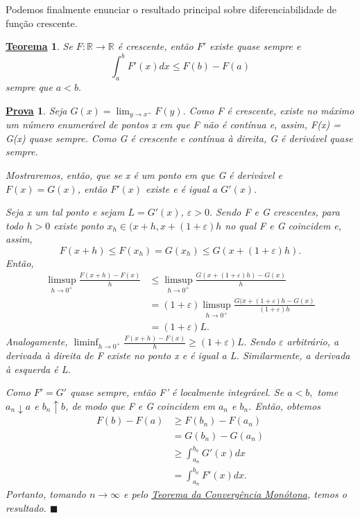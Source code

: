 \documentclass{article}
\newtheorem*{theorem*}{\underline{Teorema}}
\newtheorem*{proof*}{\underline{Prova}}
\renewcommand\qedsymbol{$\blacksquare$}
\begin{document}
  Podemos finalmente enunciar o resultado principal sobre diferenciabilidade de função crescente. 
 \begin{theorem*}
   Se \(F:\mathbb{R}\rightarrow \mathbb{R}\) é crescente, então \(F'\) existe quase sempre e 
     \[
       \int_{a}^{b}F'(x)dx \leq F(b) - F(a)
     \]
  sempre que \(a < b.\)
 \end{theorem*}
\begin{proof*}
  Seja \(G(x) = \lim_{y\to x^{+}}F(y).\) Como F é crescente, existe no máximo um número enumerável de pontos x em que F não é contínua e, assim, F(x) = G(x) quase sempre.
Como G é crescente e contínua à direita, G é derivável quase sempre. 

Mostraremos, então, que se x é um ponto em que G é derivável e \(F(x) = G(x)\), então \(F'(x)\) existe e é igual a \(G'(x).\)

Seja x um tal ponto e sejam \(L = G'(x)\), \(\varepsilon > 0.\) Sendo F e G crescentes, para todo \(h > 0\) existe ponto \(x_{h}\in (x+h, x + (1+\varepsilon )h\) no qual F e G coincidem e, assim, 
  \[
    F(x+h) \leq F(x_{h}) = G(x_{h}) \leq G(x+(1+\varepsilon )h).
  \]
Então, 
\begin{align*}
  \limsup_{h\to 0^{+}}\frac{F(x+h) - F(x)}{h} &\leq \limsup_{h\to 0^{+}}\frac{G(x+(1+\varepsilon )h)-G(x)}{h}\\ 
                                              &= (1+\varepsilon )\limsup_{h\to 0^{+}}\frac{G(x+(1+\varepsilon )h - G(x)}{(1+\varepsilon )h}\\ 
                                              &= (1+\varepsilon )L.
\end{align*}
Analogamente, \(\liminf_{h\to 0^{+}}\frac{F(x+h)-F(x)}{h}\geq (1+\varepsilon )L.\) Sendo \(\varepsilon \) arbitrário, a derivada à direita de F existe no ponto x e é igual a L. Similarmente, a derivada à esquerda é L. 

Como \(F'=G'\) quase sempre, então F' é localmente integrável. Se \(a < b,\) tome \(a_{n}\downarrow a\) e \(b_{n}\uparrow b\), de modo que F e G coincidem em \(a_{n}\) e \(b_{n}\). Então, obtemos 
\begin{align*}
  F(b) - F(a) &\geq F(b_{n}) - F(a_{n})\\ 
              &= G(b_{n}) - G(a_{n})\\ 
              &\geq \int_{a_{n}}^{b_{n}}G'(x)dx\\ 
              &= \int_{a_{n}}^{b_{n}}F'(x)dx.
\end{align*}
Portanto, tomando \(n\to \infty\) e pelo \hyperlink{monotone_convergence}{Teorema da Convergência Monótona}, temos o resultado. \qedsymbol
\end{proof*}
\end{document}
